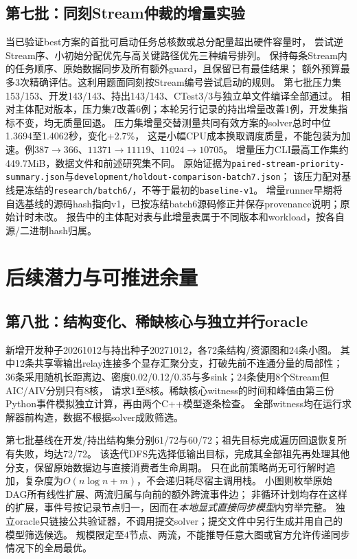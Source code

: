 \documentclass[UTF8,a4paper,11pt,fontset=fandol]{ctexart}
\begin{document}
\subsection{第七批：同刻Stream仲裁的增量实验}
当已验证best方案的首批可启动任务总核数或总分配量超出硬件容量时，
尝试逆Stream序、小初始分配优先与高关键路径优先三种编号排列。
保持每条Stream内的任务顺序、原始数据同步及所有额外guard，且保留已有最佳结果；
额外预算最多3次精确评估。这利用题面同刻按Stream编号尝试启动的规则。
第七批压力集153/153、开发143/143、持出143/143、CTest3/3与独立单文件编译全部通过。
相对主体配对版本，压力集$T$改善6例；本轮另行记录的持出增量改善1例，开发集指标不变，均无质量回退。
压力集增量交替测量共同有效方案的solver总时中位1.3694至1.4062秒，变化+2.7\%，
这是小幅CPU成本换取调度质量，不能包装为加速。例$387\to366$、$11371\to11119$、$11024\to10705$。
增量压力CLI最高工作集约449.7MiB，数据文件和前述研究集不同。
原始证据为\texttt{paired-stream-priority-summary.json}与\texttt{development/holdout-comparison-batch7.json}；
该压力配对基线是冻结的\texttt{research/batch6/}，不等于最初的\texttt{baseline-v1}。
增量runner早期将自选基线的源码hash指向v1，已按冻结batch6源码修正并保存provenance说明；原始计时未改。
报告中的主体配对表与此增量表属于不同版本和workload，按各自源/二进制hash归属。

\section{后续潜力与可推进余量}
\subsection{第八批：结构变化、稀缺核心与独立并行oracle}
新增开发种子20261012与持出种子20271012，各72条结构/资源图和24条小图。
其中12条共享零输出relay连接多个显存汇聚分支，打破先前不连通分量的局部性；
36条采用随机长距离边、密度0.02/\allowbreak{}0.12/\allowbreak{}0.35与多sink；24条使用8个Stream但AIC/AIV分别只有8核，
请求1至8核。稀缺核心witness的时间和峰值由第三份Python事件模拟独立计算，再由两个C++模型逐条检查。
全部witness均在运行求解器前构造，数据不根据solver成败筛选。

第七批基线在开发/持出结构集分别61/72与60/72；祖先目标完成遍历回退恢复所有失败，均达72/72。
该迭代DFS先选择低输出目标，完成其全部祖先再处理其他分支，保留原始数据边与直接消费者生命周期。
只在此前策略尚无可行解时追加，复杂度为$O(n\log n+m)$，不会递归耗尽宿主调用栈。
小图则枚举原始DAG所有线性扩展、两流归属与向前的额外跨流事件边；
非循环计划均存在这样的扩展，事件号按记录节点归一，因而在\emph{本地显式直接同步模型}内穷举完整。
独立oracle只链接公共验证器，不调用提交solver；提交文件中另行生成并用自己的模型筛选候选。
规模限定至4节点、两流，不能推导任意大图或官方允许传递同步情况下的全局最优。
\end{document}
